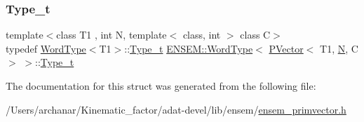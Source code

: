 \mbox{\label{structENSEM_1_1WordType_3_01PVector_3_01T1_00_01N_00_01C_01_4_01_4_aa9f3aa443de1a825586cd47f6d842fe8}} 
\subsubsection{\texorpdfstring{Type\_t}{Type\_t}\hspace{0.1cm}{\footnotesize\ttfamily [3/3]}}
{\footnotesize\ttfamily template$<$class T1 , int N, template$<$ class, int $>$ class C$>$ \\
typedef \mbox{\hyperlink{structENSEM_1_1WordType}{Word\+Type}}$<$T1$>$\+::\mbox{\hyperlink{structENSEM_1_1WordType_3_01PVector_3_01T1_00_01N_00_01C_01_4_01_4_aa9f3aa443de1a825586cd47f6d842fe8}{Type\+\_\+t}} \mbox{\hyperlink{structENSEM_1_1WordType}{E\+N\+S\+E\+M\+::\+Word\+Type}}$<$ \mbox{\hyperlink{classENSEM_1_1PVector}{P\+Vector}}$<$ T1, \mbox{\hyperlink{adat__devel_2lib_2hadron_2operator__name__util_8cc_a7722c8ecbb62d99aee7ce68b1752f337}{N}}, C $>$ $>$\+::\mbox{\hyperlink{structENSEM_1_1WordType_3_01PVector_3_01T1_00_01N_00_01C_01_4_01_4_aa9f3aa443de1a825586cd47f6d842fe8}{Type\+\_\+t}}}



The documentation for this struct was generated from the following file\+:\begin{DoxyCompactItemize}
\item 
/\+Users/archanar/\+Kinematic\+\_\+factor/adat-\/devel/lib/ensem/\mbox{\hyperlink{adat-devel_2lib_2ensem_2ensem__primvector_8h}{ensem\+\_\+primvector.\+h}}\end{DoxyCompactItemize}

